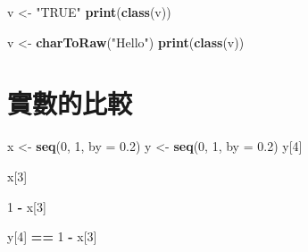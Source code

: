 \documentclass[]{book}
\newenvironment{Shaded}{\begin{snugshade}}{\end{snugshade}}
\newcommand{\DataTypeTok}[1]{\textcolor[rgb]{0.13,0.29,0.53}{#1}}
\newcommand{\DecValTok}[1]{\textcolor[rgb]{0.00,0.00,0.81}{#1}}
\newcommand{\FloatTok}[1]{\textcolor[rgb]{0.00,0.00,0.81}{#1}}
\newcommand{\KeywordTok}[1]{\textcolor[rgb]{0.13,0.29,0.53}{\textbf{#1}}}
\newcommand{\NormalTok}[1]{#1}
\newcommand{\OperatorTok}[1]{\textcolor[rgb]{0.81,0.36,0.00}{\textbf{#1}}}
\newcommand{\StringTok}[1]{\textcolor[rgb]{0.31,0.60,0.02}{#1}}
\theoremstyle{definition}
\theoremstyle{definition}
\theoremstyle{definition}
\theoremstyle{remark}
\begin{document}
\begin{Shaded}
\begin{Highlighting}[]
\NormalTok{v <-}\StringTok{ "TRUE"}
\KeywordTok{print}\NormalTok{(}\KeywordTok{class}\NormalTok{(v))}
\end{Highlighting}
\end{Shaded}

\begin{Shaded}
\begin{Highlighting}[]
\NormalTok{v <-}\StringTok{ }\KeywordTok{charToRaw}\NormalTok{(}\StringTok{"Hello"}\NormalTok{)}
\KeywordTok{print}\NormalTok{(}\KeywordTok{class}\NormalTok{(v))}
\end{Highlighting}
\end{Shaded}

\section{實數的比較}

\begin{Shaded}
\begin{Highlighting}[]
\NormalTok{x <-}\StringTok{ }\KeywordTok{seq}\NormalTok{(}\DecValTok{0}\NormalTok{, }\DecValTok{1}\NormalTok{, }\DataTypeTok{by =} \FloatTok{0.2}\NormalTok{)}
\NormalTok{y <-}\StringTok{ }\KeywordTok{seq}\NormalTok{(}\DecValTok{0}\NormalTok{, }\DecValTok{1}\NormalTok{, }\DataTypeTok{by =} \FloatTok{0.2}\NormalTok{)}
\NormalTok{y[}\DecValTok{4}\NormalTok{]}
\end{Highlighting}
\end{Shaded}

\begin{Shaded}
\begin{Highlighting}[]
\NormalTok{x[}\DecValTok{3}\NormalTok{]}
\end{Highlighting}
\end{Shaded}

\begin{Shaded}
\begin{Highlighting}[]
\DecValTok{1} \OperatorTok{-}\StringTok{ }\NormalTok{x[}\DecValTok{3}\NormalTok{]}
\end{Highlighting}
\end{Shaded}

\begin{Shaded}
\begin{Highlighting}[]
\NormalTok{y[}\DecValTok{4}\NormalTok{] }\OperatorTok{==}\StringTok{ }\DecValTok{1} \OperatorTok{-}\StringTok{ }\NormalTok{x[}\DecValTok{3}\NormalTok{]}
\end{Highlighting}
\end{Shaded}
\end{document}

